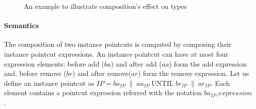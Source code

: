 \documentclass{acm_proc_article-sp}
\begin{document}

\begin{figure}%
\centering
{}
\hspace{40pt}
\vspace{10pt}
\caption{An example to illustrate composition's effect on types}
\label{fig:compotypes}
\end{figure}


\paragraph{Semantics}
The composition of two instance pointcuts is computed by composing their instance pointcut expressions.
An instance pointcut can have at most four expression elements; before add ($ba$) and after add ($aa$) form the add expression and, before remove ($br$) and after remove($ar$) form the remove expression. Let us define an instance pointcut as $IP = ba_{IP}\;\|\;aa_{IP}\;\textrm{UNTIL}\;br_{IP}\;\|\;ar_{IP}$. Each element contains a pointcut expression referred with the notation $ba_{IP}\_expression$. 
\end{document}
